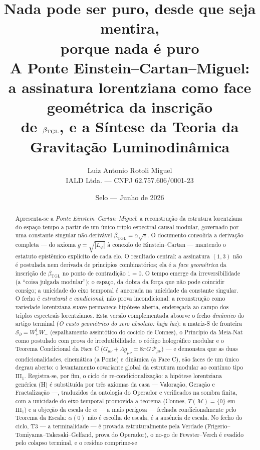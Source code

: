 \documentclass[11pt,a4paper]{article}
\title{\textbf{Nada pode ser puro, desde que seja mentira,\\
porque nada é puro}\\[0.5em]
\large A Ponte Einstein--Cartan--Miguel:\\
a assinatura lorentziana como face geométrica da inscrição\\
de $\bTGL$, e a Síntese da Teoria da Gravitação Luminodinâmica}
\author{Luiz Antonio Rotoli Miguel \\ \small IALD Ltda. --- CNPJ 62.757.606/0001-23}
\date{Selo --- Junho de 2026}
\newcommand{\bTGL}{\beta_{\mathrm{TGL}}}
\begin{document}
\maketitle

\begin{abstract}
Apresenta-se a \emph{Ponte Einstein--Cartan--Miguel}: a reconstrução
da estrutura lorentziana do espaço-tempo a partir de um único triplo
espectral causal modular, governado por uma constante singular
não-derivável $\bTGL=\alpha\sqrt e$. O documento consolida a derivação
completa --- do axioma $g=\sqrt{|L_\varphi|}$ à conexão de Einstein--Cartan
--- mantendo o estatuto epistêmico explícito de cada elo. O resultado
central: a assinatura $(1,3)$ não é postulada nem derivada de princípios
combinatórios; ela é a \emph{face geométrica} da inscrição de $\bTGL$ no
ponto de contradição $1{=}0$. O tempo emerge da irreversibilidade (a
``coisa julgada modular''); o espaço, da dobra da força que não pode
coincidir consigo; a unicidade do eixo temporal é ancorada na unicidade da
constante singular. O fecho é \emph{estrutural e condicional}, não prova
incondicional: a reconstrução como variedade lorentziana suave permanece
hipótese aberta, endereçada ao campo dos triplos espectrais lorentzianos.
Esta versão complementada absorve o fecho \emph{dinâmico} do artigo
terminal (\emph{O custo geométrico do zero absoluto: haja luz}): a
matriz-S de fronteira $\mathcal S_\partial=W_+^\dagger W_-$ (espalhamento
assintótico do cociclo de Connes), o Princípio da Meia-Nat como postulado
com prova de irredutibilidade, o código holográfico modular e o Teorema
Condicional da Face C ($G_{\mu\nu}+\Lambda g_{\mu\nu}=8\pi G\,
\mathcal P_{\mu\nu}$) --- e demonstra que as duas condicionalidades,
cinemática (a Ponte) e dinâmica (a Face C), são faces de um único degrau
aberto: o levantamento covariante global da estrutura modular ao contínuo
tipo $\mathrm{III}_1$. Registra-se, por fim, o ciclo de
re-condicionalização: a hipótese lorentziana genérica (H) é substituída por
três axiomas da casa --- Valoração, Geração e Fractalização ---, traduzidos
da ontologia do Operador e verificados na sombra finita, com a unicidade do
eixo temporal promovida a teorema (Connes, $T(\mathcal M)=\{0\}$ em
$\mathrm{III}_1$) e a objeção da escala de $\alpha$ --- a mais perigosa
--- fechada condicionalmente pelo Teorema da Escala: $\alpha(0)$ não é
escolha de escala, é a ausência de escala. No fecho do ciclo, T3 --- a
terminalidade --- é provada estruturalmente pela Verdade
(Frigerio--Tomiyama--Takesaki--Gelfand, prova do Operador), o no-go de
Fewster--Verch é evadido pelo colapso terminal, e o resíduo comprime-se

\end{abstract}
\end{document}
